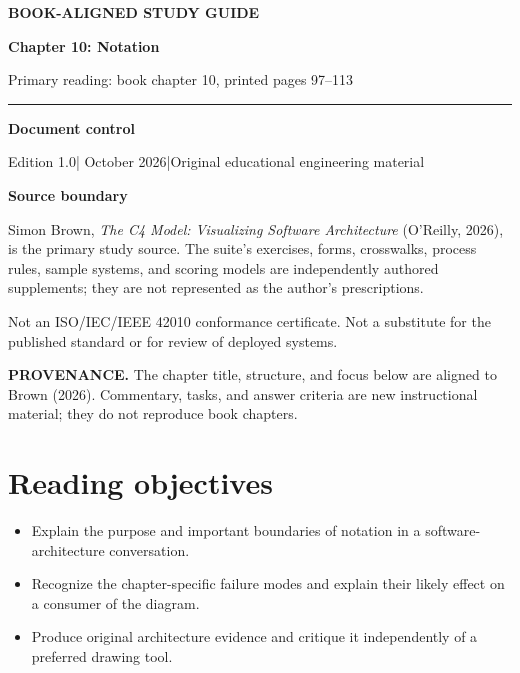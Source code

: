 \documentclass[10pt,letterpaper]{article}
\newcommand{\SourceNote}[1]{\par\smallskip\noindent\colorbox{C4Light}{\parbox{0.94\linewidth}{\footnotesize\textbf{PROVENANCE.} #1}}\par\medskip}
\newcommand{\DocStart}[3]{%
\begin{document}
\begin{titlepage}
\renewcommand{\thepage}{title-\arabic{page}}
\vspace*{0.55in}
{\sffamily\bfseries\small\color{C4Teal}#1}\par\vspace{0.24in}
{\sffamily\bfseries\fontsize{26}{31}\selectfont\color{C4Navy}#2}\par\vspace{0.18in}
{\large\color{C4Gray}#3}\par\vspace{0.4in}
\textcolor{C4Teal}{\rule{\linewidth}{1.15pt}}\par\vspace{0.24in}
\textbf{Document control}\par
Edition 1.0\quad|\quad 30 October 2026\quad|\quad Original educational engineering material\par
\vspace{0.17in}
\textbf{Source boundary}\par
Simon Brown, \emph{The C4 Model: Visualizing Software Architecture} (O'Reilly, 2026), is the primary study source. The suite's exercises, forms, crosswalks, process rules, sample systems, and scoring models are independently authored supplements; they are not represented as the author's prescriptions.\par
\vfill
{\small\color{C4Gray}Not an ISO/IEC/IEEE 42010 conformance certificate. Not a substitute for the published standard or for review of deployed systems.}\par
\end{titlepage}
}
\DocStart{BOOK-ALIGNED STUDY GUIDE}{Chapter 10: Notation}{Primary reading: book chapter 10, printed pages 97–113}
\SourceNote{The chapter title, structure, and focus below are aligned to Brown (2026). Commentary, tasks, and answer criteria are new instructional material; they do not reproduce book chapters.}
\section{Reading objectives}
\begin{itemize}
\item Explain the purpose and important boundaries of notation in a software-architecture conversation.
\item Recognize the chapter-specific failure modes and explain their likely effect on a consumer of the diagram.
\item Produce original architecture evidence and critique it independently of a preferred drawing tool.
\end{itemize}
\end{document}
